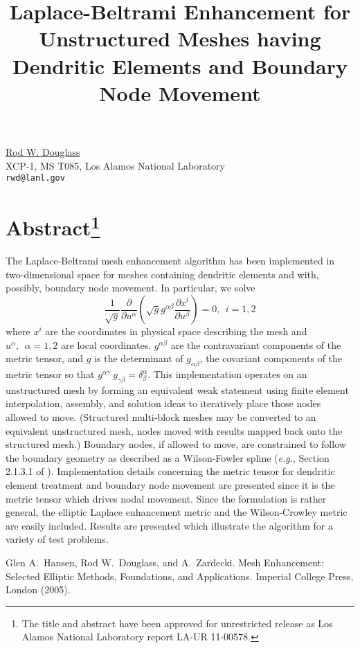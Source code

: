 \title{Laplace-Beltrami Enhancement for Unstructured Meshes having Dendritic Elements and Boundary Node Movement}
\author{} \institute{}
\maketitle

\begin{center}
{\large \underline{Rod W. Douglass}}\\
XCP-1, MS T085, Los Alamos National Laboratory\\
{\tt rwd@lanl.gov}
\end{center}

\section*{Abstract\footnote{The title and abstract have been approved for unrestricted release as Los Alamos 
National Laboratory report LA-UR 11-00578.}}
The Laplace-Beltrami mesh enhancement algorithm \cite{Hansen05} has been implemented in two-dimensional space for meshes containing dendritic elements and with, possibly, boundary node movement. In particular, we solve
\begin{equation*}
\frac{1}{\sqrt{g}} \frac{\partial}{\partial u^{\alpha}}\left(\sqrt{g} g^{\alpha \beta}
 \frac{\partial x^i}{\partial u^{\beta}} \right) = 0, \ \ i = 1,2
 \end{equation*}
\noindent where $x^i$ are the coordinates in physical space describing the mesh and $u^{\alpha}, \ \ \alpha=1,2$ are local coordinates.  $g^{\alpha \beta}$ are the contravariant components of the metric tensor, and $g$ is the determinant of $g_{\alpha \beta}$, the covariant components of the metric tensor so that $g^{\alpha\gamma}\ g_{\gamma \beta} = \delta^{\alpha}_{\beta}$. This implementation operates on an unstructured mesh by forming an equivalent weak statement using finite element interpolation, assembly, and solution ideas to iteratively place those nodes allowed to move.  (Structured multi-block meshes may be converted to an equivalent unstructured mesh, nodes moved with results mapped back onto the structured mesh.)  Boundary nodes, if allowed to move, are constrained to follow the boundary geometry as described as a Wilson-Fowler spline ({\it e.g.}, Section 2.1.3.1 of \cite{Hansen05}).  Implementation details concerning the metric tensor for dendritic element treatment and boundary node movement are presented since it is the metric tensor which drives nodal movement. Since the formulation is rather general, the elliptic Laplace enhancement metric and the Wilson-Crowley metric are easily included.  Results are presented which illustrate the algorithm for a variety of test problems.


\begin{thebibliography}{10}
{\sc Glen A.~Hansen, Rod W.~Douglass, and A.~Zardecki}. {Mesh Enhancement: Selected Elliptic Methods, Foundations, and Applications}. Imperial College Press, London (2005).
\end{thebibliography}